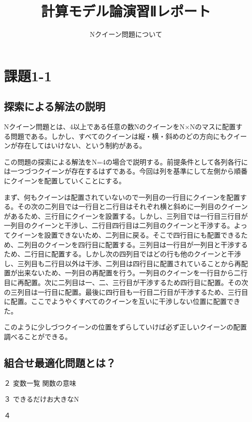 \documentclass{jsarticle}
\begin{document}
\title{計算モデル論演習Ⅱレポート}
\subtitle{Nクイーン問題について}
\maketitle

\section{課題1-1}
\subsection{探索による解法の説明}
Nクイーン問題とは、4以上である任意の数NのクイーンをN×Nのマスに配置する問題である。しかし、すべてのクイーンは縦・横・斜めのどの方向にもクイーンが存在してはいけない、という制約がある。

この問題の探索による解法をN=4の場合で説明する。前提条件として各列各行には一つづつクイーンが存在するはずである。今回は列を基準にして左側から順番にクイーンを配置していくことにする。

まず、何もクイーンは配置されていないので一列目の一行目にクイーンを配置する。その次の二列目では一行目と二行目はそれぞれ横と斜めに一列目のクイーンがあるため、三行目にクイーンを設置する。しかし、三列目では一行目三行目が一列目のクイーンと干渉し、二行目四行目は二列目のクイーンと干渉する。よってクイーンを設置できないため、二列目に戻る。そこで四行目にも配置できるため、二列目のクイーンを四行目に配置する。三列目は一行目が一列目と干渉するため、二行目に配置する。しかし次の四列目ではどの行も他のクイーンと干渉し、三列目も二行目以外は干渉、二列目は四行目に配置されていることから再配置が出来ないため、一列目の再配置を行う。一列目のクイーンを一行目から二行目に再配置。次に二列目は一、二、三行目が干渉するため四行目に配置。その次の三列目は一行目に配置。最後に四行目も一行目二行目が干渉するため、三行目に配置。ここでようやくすべてのクイーンを互いに干渉しない位置に配置できた。

このように少しづつクイーンの位置をずらしていけば必ず正しいクイーンの配置調べることができる。

\subsection{組合せ最適化問題とは？}



２
変数一覧
関数の意味

３
できるだけお大きなN

４
\end{document}
